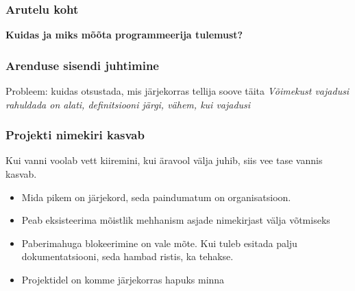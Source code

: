 \begin{frame}[fragile]
  \frametitle{Arutelu koht}
		\begin{center}
			\textbf{Kuidas ja miks mõõta programmeerija tulemust?}
		\end{center}
\end{frame}

\begin{frame}[fragile]
  \frametitle{Arenduse sisendi juhtimine}
  \begin{center}
	  Probleem: kuidas otsustada, mis järjekorras tellija soove täita
\bigskip
	\emph{Võimekust vajadusi rahuldada on alati, definitsiooni järgi, vähem, kui vajadusi}
  \end{center}
\end{frame}
    
\begin{frame}[fragile]
  \frametitle{Projekti nimekiri kasvab}
  Kui vanni voolab vett kiiremini, kui äravool välja juhib, siis vee tase vannis kasvab.
		\begin{itemize}
			\item Mida pikem on järjekord, seda paindumatum on organisatsioon. 
			\item Peab eksisteerima mõistlik mehhanism asjade nimekirjast välja võtmiseks
			\item Paberimahuga blokeerimine on vale mõte. Kui tuleb esitada palju dokumentatsiooni, seda hambad ristis, ka tehakse. 
			\item Projektidel on komme järjekorras hapuks minna
		\end{itemize}
\end{frame}

